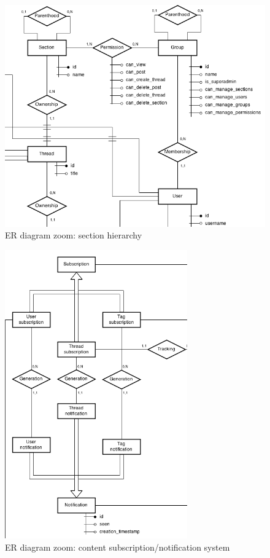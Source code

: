 \documentclass[12pt]{report}
\begin{document}
                \begin{figure}[!htb]
                \caption{ER diagram zoom: section hierarchy}
                \centering
                \includegraphics[width=1\textwidth]{erzm1}
                \end{figure}

                \begin{figure}[!htb]
                \caption{ER diagram zoom: content subscription/notification system}
                \centering
                \includegraphics[width=0.7\textwidth]{erzm2}
                \end{figure}
\end{document}
